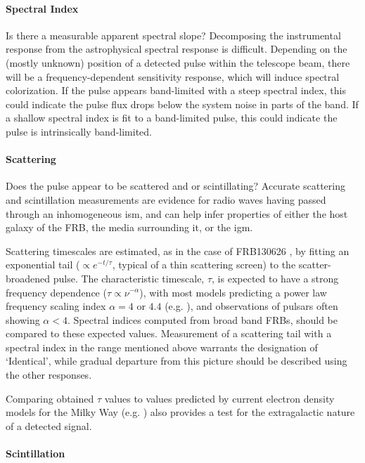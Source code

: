 \documentclass[a4paper,fleqn,usenatbib]{mnras}
\begin{document}
\paragraph{Spectral Index}

Is there a measurable apparent spectral slope? Decomposing the instrumental
response from the astrophysical spectral response is difficult.  Depending on
the (mostly unknown) position of a detected pulse within the telescope beam,
there will be a frequency-dependent sensitivity response, which will induce
spectral colorization.  If the pulse appears band-limited with a steep spectral
index, this could indicate the pulse flux drops below the system noise in parts
of the band. If a shallow spectral index is fit to a band-limited pulse, this
could indicate the pulse is intrinsically band-limited.

\paragraph{Scattering}

Does the pulse appear to be scattered and or scintillating?  Accurate scattering
and scintillation measurements are evidence for radio waves having passed
through an inhomogeneous \gls{ism}, and can help infer properties of either the
host galaxy of the FRB,  the media surrounding it, or the \gls{igm}.

Scattering timescales are estimated, as in the case of FRB130626
\citep{2016MNRAS.460L..30C}, by fitting an exponential tail ($\propto
e^{-t/\tau}$, typical of a thin scattering screen) to the scatter-broadened
pulse. The characteristic timescale, $\tau$, is expected to have a strong
frequency dependence ($\tau \propto \nu^{-\alpha}$), with most models predicting
a power law frequency scaling index $\alpha =4$ or $4.4$ (e.g.
\citealt{Rickett1977}), and observations of pulsars often showing $\alpha < 4$.
Spectral indices computed from broad band FRBs, should be compared to these
expected values.  Measurement of a scattering tail with a spectral index in the
range mentioned above warrants the designation of `Identical', while gradual
departure from this picture should be described using the other responses. 

Comparing obtained $\tau$ values to values predicted by current electron density
models for the Milky Way (e.g.
\citealt{2002astro.ph..7156C,2017ApJ...835...29Y}) also provides a test for the
extragalactic nature of a detected signal.

\paragraph{Scintillation}
\end{document}
